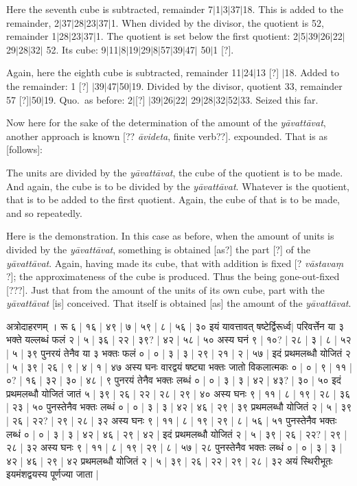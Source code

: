 \documentclass[12pt]{book}
\let\*=\d
\def\ya{\textit{y\=avat\-t\=avat}}
\def\danda{$|$}
\begin{document}
\newpage


Here the seventh cube is subtracted, remainder 7\danda 1\danda 3\danda 37\danda 18. 
This is added to the remainder, 2\danda 37\danda 28\danda 23\danda 37\danda 1.
When divided by the divisor, the quotient is 52, remainder 
1\danda 28\danda 23\danda 37\danda 1. The quotient 
is set below the first quotient: 2\danda 5\danda 39\danda 26\danda 22\danda 29\danda 28\danda 32\danda
52. Its cube: 9\danda 11\danda 8\danda 19\danda 29\danda 8\danda 57\danda 39\danda 47\danda
50\danda 1 [?]. 

Again, here the eighth cube is subtracted, remainder 11\danda 24\danda 13 [?] \danda 18. Added to the
remainder: 1 [?] \danda 39\danda 47\danda 50\danda 19. Divided by the divisor, quotient 33, 
remainder 57 [?]\danda 50\danda 19. Quo.\ as before: 2\danda [?] \danda 39\danda 26\danda 22\danda
29\danda 28\danda 32\danda 52\danda 33. Seized this far. 

Now here for the sake of the determination of the amount of the \ya, another approach is known 
[?? \textit{\=avideta}, finite verb??]. 
expounded. That is as [follows]: 

The units are divided by the \ya, the cube of the quotient is to be made. And again, the cube is
to be divided by the \ya. Whatever is the quotient, that is to be added to the first quotient. Again,
the cube of that is to be made, and so repeatedly.  

Here is the demonstration. In this case as before, when the amount of units is divided by the \ya, 
something is obtained [as?] the part [?] of the \ya. Again, having made its cube, that with addition
is fixed [? \textit{v\=astava\*m} ?]; the approximateness of the cube is produced. Thus the being
gone-out-fixed [???].  Just that from the amount of the units of its own cube, part with the \ya 
[is] conceived. That itself is obtained [as] the amount of the \ya. 

\newpage

{\s अत्रोदाहरणम् । रू ६ | १६ | ४९ | ७ | ५९ | ८ | ५६ | ३० इयं यावत्तावत् षष्टेर्द्विरूर्ध्व$|$
परिवर्त्तेन या ३ भक्ते यल्लब्धं फलं २ | ५ | ३६ | २२ | ३९? | ४२ | ५८ | ५० अस्य घनं ९ | १०? | २८ | ३ | ८ | ५२ | ५ | ३९
पुनरयं तेनैव या ३ भक्तः फलं ० | ० | ३ | ३ | २९ | २१ | २ | ५७ |
इदं प्रथमलब्धौ योजितं २ | ५ | ३९ | २६ | ९ | ४ | १ | ४७ अस्य घनः वारद्वयं षष्ट्या भक्तः जातो विकलात्मकः ० | ० | ९ | ११ | ०? | १६ | ३२ | ३० | ४८ | ९ पुनरयं तेनैव भक्तः लब्धं ० | ० | ३ | ३ | ४२ | ४३? | ३० | ५०
इदं प्रथमलब्धौ योजितं जातं ५ | ३९ | २६ | २२ | २८ | २९ | ४० अस्य घनः ९ | ११ | ८ | १९ | २८ | ३६ | २३ | ५० पुनस्तेनैव भक्तः लब्धं ० | ० | ३ | ३ | ४२ | ४६ | २९ | ३९ प्रथमलब्धौ योजितं २ | ५ | ३९ | २६ | २२? | २९ | २८ | ३२
अस्य घनः ९ | ११ | ८ | १९ | २९ | ८ | ५६ | ५१ पुनस्तेनैव भक्तः लब्धं ० | ० | ३ | ३ | ४२ | ४६ | २९ | ४२ | इदं प्रथमलब्धौ योजितं २ | ५ | ३९ | २६ | २२? | २९ | २८ | ३२ अस्य घनः ९ | ११ | ८ | १९ | २९ | ८ | ५७ | २८
पुनस्तेनैव भक्तः लब्धं ० | ० | ३ | ३ | ४२ | ४६ | २९ | ४२ प्रथमलब्धौ योजितं २ | ५ | ३९ | २६ | २२ | २९ | २८ | ३२ अयं स्थिरीभूतः इयमंशद्वयस्य पूर्णज्या जाता |} 
\end{document}
